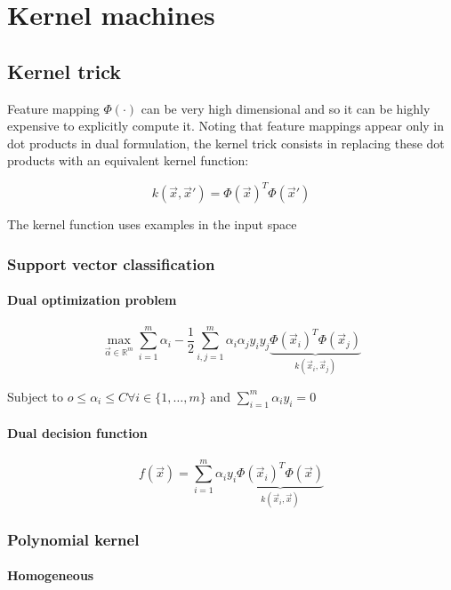 \chapter{Kernel machines}

\section{Kernel trick}
Feature mapping $\Phi(\cdot)$ can be very high dimensional and so it can be highly expensive to explicitly compute it.
Noting that feature mappings appear only in dot products in dual formulation, the kernel trick consists in replacing these dot products with an equivalent kernel function:

$$k(\vec{x},\vec{x}') = \Phi(\vec{x})^T\Phi(\vec{x}')$$

The kernel function uses examples in the input space

	\subsection{Support vector classification}

		\subsubsection{Dual optimization problem}

		$$\max\limits_{\vec{\alpha}\in\mathbb{R}^m}\sum\limits_{i=1}^m\alpha_i-\frac{1}{2}\sum\limits_{i,j=1}^m\alpha_i\alpha_jy_iy_j\underbrace{\Phi(\vec{x}_i)^T\Phi(\vec{x}_j)}_{k(\vec{x}_i,\vec{x}_j)}$$

		Subject to $o\le\alpha_i\le C\forall i\in\{1,\dots,m\}$ and $\sum\limits_{i=1}^m\alpha_iy_i=0$

		\subsubsection{Dual decision function}

		$$f(\vec{x}) = \sum\limits_{i=1}^m\alpha_iy_i\underbrace{\Phi(\vec{x}_i)^T\Phi(\vec{x})}_{k(\vec{x}_i,\vec{x})}$$

	\subsection{Polynomial kernel}

		\subsubsection{Homogeneous}

